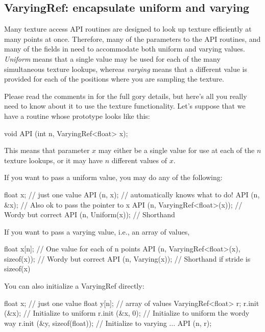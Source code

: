 \subsection{{\cf VaryingRef}: encapsulate uniform and varying}

Many texture access API routines are designed to look up
texture efficiently at many points at once.  Therefore, many of
the parameters to the API routines, and many of the fields in
\TextureOptions need to accommodate both uniform and varying values.
\emph{Uniform} means that a single value may be used for each of
the many simultaneous texture lookups, whereas \emph{varying} means
that a different value is provided for each of the positions where
you are sampling the texture.

Please read the comments in  for the full gory 
details, but here's all you really need to know about it to use the
texture functionality.  Let's suppose that we have a routine 
whose prototype looks like this:

\begin{code}
        void API (int n, VaryingRef<float> x);
\end{code}

\noindent This means that parameter $x$ may either be a single value
for use at each of the $n$ texture lookups, or it may have $n$ different
values of $x$.  

If you want to pass a uniform value, you may do any of the following:

\begin{code}
      float x;   // just one value
      API (n, x);   // automatically knows what to do!
      API (n, &x);  // Also ok to pass the pointer to x
      API (n, VaryingRef<float>(x));  // Wordy but correct
      API (n, Uniform(x));  // Shorthand
\end{code}

If you want to pass a varying value, i.e., an array of values,

\begin{code}
      float x[n];   // One value for each of n points
      API (n, VaryingRef<float>(x), sizeof(x));  // Wordy but correct
      API (n, Varying(x));  // Shorthand if stride is sizeof(x)
\end{code}

You can also initialize a VaryingRef directly:

\begin{code}
    float x;     // just one value
    float y[n];  // array of values
    VaryingRef<float> r;
    r.init (&x);                 // Initialize to uniform
    r.init (&x, 0);              // Initialize to uniform the wordy way
    r.init (&y, sizeof(float));  // Initialize to varying
    ...
    API (n, r);
\end{code}



